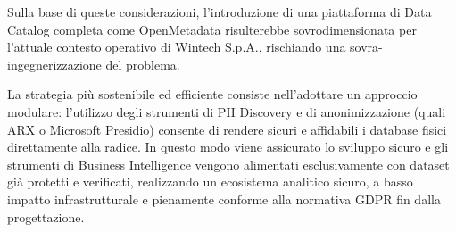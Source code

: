 Sulla base di queste considerazioni, l'introduzione di una piattaforma di Data Catalog completa come OpenMetadata risulterebbe sovrodimensionata per 
l'attuale contesto operativo di Wintech S.p.A., rischiando una sovra-ingegnerizzazione del problema.

La strategia più sostenibile ed efficiente consiste nell'adottare un approccio modulare: l'utilizzo degli strumenti di PII Discovery e di anonimizzazione (quali ARX o 
Microsoft Presidio) consente di rendere sicuri e affidabili i database fisici direttamente alla radice. In questo modo viene assicurato lo sviluppo sicuro e gli strumenti 
di Business Intelligence vengono alimentati esclusivamente con dataset già protetti e verificati, realizzando un ecosistema analitico sicuro, a basso impatto infrastrutturale 
e pienamente conforme alla normativa GDPR fin dalla progettazione.